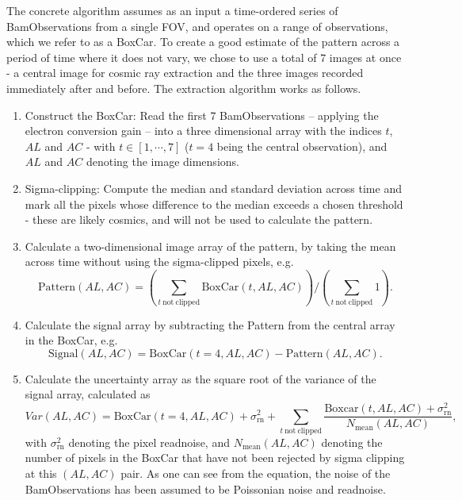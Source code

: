 \documentclass[a4paper, 11pt]{article}
\begin{document}
The concrete algorithm assumes as an input a time-ordered series of BamObservations from a single FOV, and operates on a range of observations, which we refer to as a BoxCar. To create a good estimate of the pattern across a period of time where it does not vary, we chose to use a total of 7 images at once - a central image for cosmic ray extraction and the three images recorded immediately after and before. The extraction algorithm works as follows.

\begin{enumerate}
  \item Construct the BoxCar: Read the first 7 BamObservations -- applying the electron conversion gain -- into a three dimensional array with the indices $t$, $AL$ and $AC$ - with $t \in [1,\cdots,7]$ ($t = 4$ being the central observation), and $AL$ and $AC$ denoting the image dimensions.
  \item Sigma-clipping: Compute the median and standard deviation across time and mark all the pixels whose difference to the median exceeds a chosen threshold - these are likely cosmics, and will not be used to calculate the pattern.
  \item Calculate a two-dimensional image array of the pattern, by taking the mean across time without using the sigma-clipped pixels, e.g.
\begin{equation}
  \mathrm{Pattern}\left( AL,AC \right) = \left( \sum\limits_{t~\mathrm{not~clipped}} \mathrm{BoxCar}\left( t, AL, AC \right) \right) \bigg/ \left( \sum\limits_{t~\mathrm{not~clipped}} 1\right).
\end{equation}
  \item Calculate the signal array by subtracting the Pattern from the central array in the BoxCar, e.g.
\begin{equation}
  \mathrm{Signal}\left( AL,AC \right) = \mathrm{BoxCar}\left(t=4,AL,AC \right) - \mathrm{Pattern}\left( AL,AC \right).
\end{equation}
  \item Calculate the uncertainty array as the square root of the variance of the signal array, calculated as
    \begin{equation}
      Var\left(AL,AC\right) = \mathrm{BoxCar}\left(t=4,AL,AC\right) + \sigma_\mathrm{rn}^2 + \sum\limits_{t~\mathrm{not~clipped}} \frac{\mathrm{Boxcar}\left(t,AL,AC\right) + \sigma_\mathrm{rn}^2}{N_\mathrm{mean}\left(AL,AC\right)},
    \end{equation}
  with $\sigma_\mathrm{rn}^2$ denoting the pixel readnoise, and $N_\mathrm{mean}\left(AL,AC\right)$ denoting the number of pixels in the BoxCar that have not been rejected by sigma clipping at this $\left(AL,AC  \right)$ pair. As one can see from the equation, the noise of the BamObservations has been assumed to be Poissonian noise and readnoise.

\end{enumerate}
\end{document}
